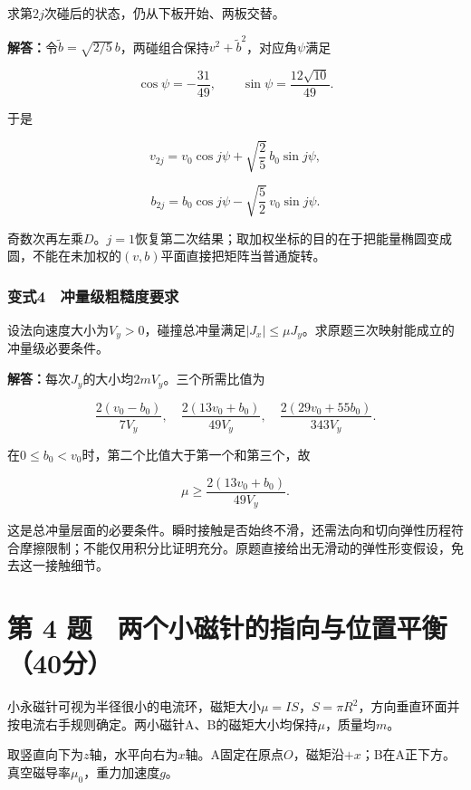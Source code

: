 \documentclass[12pt,a4paper,fontset=fandol]{ctexart}
\begin{document}
求第\(2j\)次碰后的状态，仍从下板开始、两板交替。

\textbf{解答：}令\(\widetilde b=\sqrt{2/5}\,b\)，两碰组合保持\(v^2+\widetilde b^2\)，对应角\(\psi\)满足

\[
\cos\psi=-\frac{31}{49},\qquad
\sin\psi=\frac{12\sqrt{10}}{49}.
\]

于是

\[
v_{2j}=v_0\cos j\psi+\sqrt{\frac25}\,b_0\sin j\psi,
\]

\[
b_{2j}=b_0\cos j\psi-\sqrt{\frac52}\,v_0\sin j\psi.
\]

奇数次再左乘\(D\)。\(j=1\)恢复第二次结果；取加权坐标的目的在于把能量椭圆变成圆，不能在未加权的\((v,b)\)平面直接把矩阵当普通旋转。

\subsubsection{变式4　冲量级粗糙度要求}\label{ux53d8ux5f0f4-ux51b2ux91cfux7ea7ux7c97ux7cd9ux5ea6ux8981ux6c42}

设法向速度大小为\(V_y>0\)，碰撞总冲量满足\(|J_x|\leq\mu J_y\)。求原题三次映射能成立的冲量级必要条件。

\textbf{解答：}每次\(J_y\)的大小均\(2mV_y\)。三个所需比值为

\[
\frac{2(v_0-b_0)}{7V_y},\quad
\frac{2(13v_0+b_0)}{49V_y},\quad
\frac{2(29v_0+55b_0)}{343V_y}.
\]

在\(0\leq b_0<v_0\)时，第二个比值大于第一个和第三个，故

\[
\mu\geq\frac{2(13v_0+b_0)}{49V_y}.
\]

这是总冲量层面的必要条件。瞬时接触是否始终不滑，还需法向和切向弹性历程符合摩擦限制；不能仅用积分比证明充分。原题直接给出无滑动的弹性形变假设，免去这一接触细节。

\clearpage

\section{第 4
题　两个小磁针的指向与位置平衡（40分）}\label{ux7b2c-4-ux9898-ux4e24ux4e2aux5c0fux78c1ux9488ux7684ux6307ux5411ux4e0eux4f4dux7f6eux5e73ux886140ux5206}

小永磁针可视为半径很小的电流环，磁矩大小\(\mu=IS\)，\(S=\pi R^2\)，方向垂直环面并按电流右手规则确定。两小磁针A、B的磁矩大小均保持\(\mu\)，质量均\(m\)。

取竖直向下为\(z\)轴，水平向右为\(x\)轴。A固定在原点\(O\)，磁矩沿\(+x\)；B在A正下方。真空磁导率\(\mu_0\)，重力加速度\(g\)。
\end{document}
